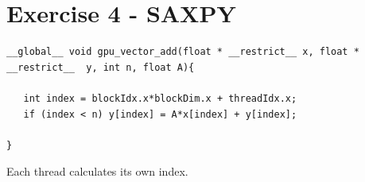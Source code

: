 \documentclass[12pt]{article}
\begin{document}
\section{Exercise 4 - SAXPY}


\begin{lstlisting}[style=CStyle]
  __global__ void gpu_vector_add(float * __restrict__ x, float * __restrict__  y, int n, float A){
    
   int index = blockIdx.x*blockDim.x + threadIdx.x;
   if (index < n) y[index] = A*x[index] + y[index];
        
} 
\end{lstlisting}

Each thread calculates its own index.
      
\end{document}
